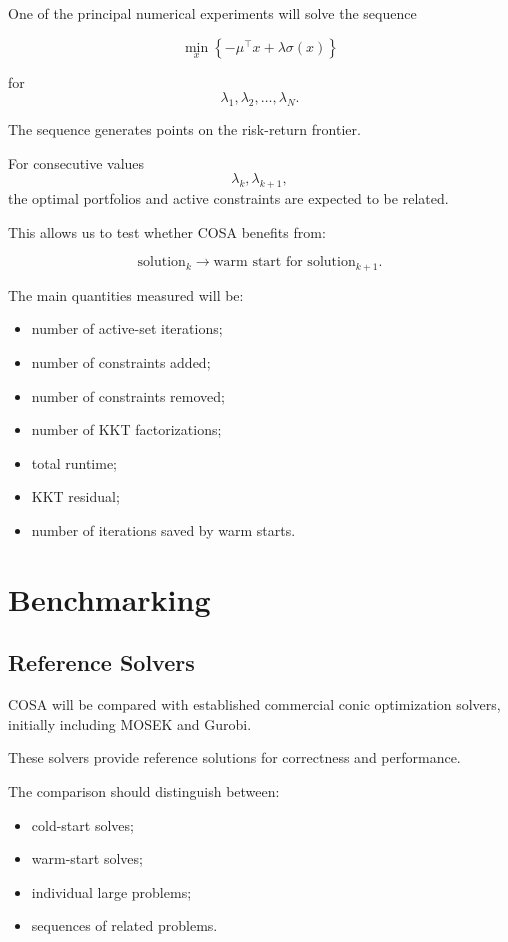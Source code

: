 \documentclass[11pt,a4paper]{article}
\begin{document}
One of the principal numerical experiments will solve the sequence

\[
\min_x
\left\{
-\mu^\top x+\lambda\sigma(x)
\right\}
\]

for
\[
\lambda_1,\lambda_2,\ldots,\lambda_N.
\]

The sequence generates points on the risk-return frontier.

For consecutive values
\[
\lambda_k,\lambda_{k+1},
\]
the optimal portfolios and active constraints are expected to be
related.

This allows us to test whether COSA benefits from:

\[
\text{solution}_{k}
\longrightarrow
\text{warm start for solution}_{k+1}.
\]

The main quantities measured will be:

\begin{itemize}
    \item number of active-set iterations;
    \item number of constraints added;
    \item number of constraints removed;
    \item number of KKT factorizations;
    \item total runtime;
    \item KKT residual;
    \item number of iterations saved by warm starts.
\end{itemize}

\section{Benchmarking}

\subsection{Reference Solvers}

COSA will be compared with established commercial conic optimization
solvers, initially including MOSEK and Gurobi.

These solvers provide reference solutions for correctness and
performance.

The comparison should distinguish between:

\begin{itemize}
    \item cold-start solves;
    \item warm-start solves;
    \item individual large problems;
    \item sequences of related problems.
\end{itemize}
\end{document}
